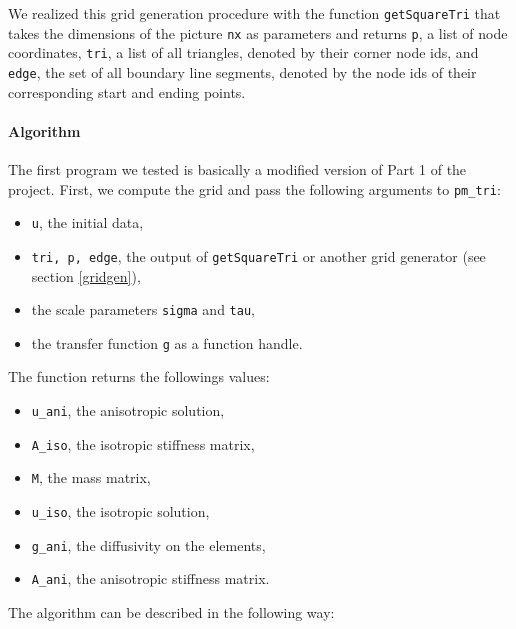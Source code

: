 \documentclass{report}
\begin{document}
We realized this grid generation procedure with the function \texttt{getSquareTri} that takes the dimensions of the picture \texttt{nx} as parameters and returns \texttt{p}, a list of node coordinates, \texttt{tri}, a list of all triangles, denoted by their corner node ids, and \texttt{edge}, the set of all boundary line segments, denoted by the node ids of their corresponding start and ending points.

\paragraph{Algorithm}

The first program we tested is basically a modified version of Part 1 of the project. First, we compute the grid and pass the following arguments to \texttt{pm\_tri}:
\begin{itemize}
    \item
    \texttt{u}, the initial data,
    
    \item 
    \texttt{tri, p, edge}, the output of \texttt{getSquareTri} or another grid generator (see section
     \ref{gridgen}),
     
    \item
    the scale parameters \texttt{sigma} and \texttt{tau},
    
    \item
    the transfer function \texttt{g} as a function handle.
\end{itemize}
The function returns the followings values:
\begin{itemize}
    \item 
    \texttt{u\_ani}, the anisotropic solution,
    \item
    \texttt{A\_iso}, the isotropic stiffness matrix,
    \item
    \texttt{M}, the mass matrix,
    \item
    \texttt{u\_iso}, the isotropic solution,
    \item
    \texttt{g\_ani}, the diffusivity on the elements,
    \item
    \texttt{A\_ani}, the anisotropic stiffness matrix.
\end{itemize}
The algorithm can be described in the following way:
\end{document}
